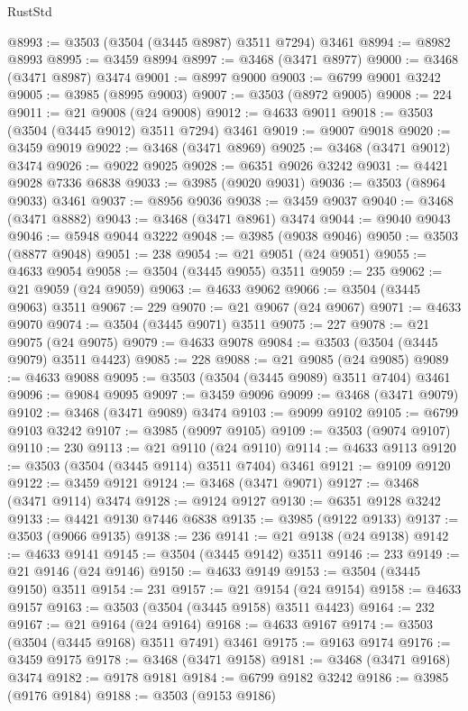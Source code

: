 \begin{lexlean}{RustStd}
\begin{coremodule}
@8993 := @3503 (@3504 (@3445 @8987) @3511 @7294) @3461
@8994 := @8982 @8993
@8995 := @3459 @8994
@8997 := @3468 (@3471 @8977)
@9000 := @3468 (@3471 @8987) @3474
@9001 := @8997 @9000
@9003 := @6799 @9001 @3242
@9005 := @3985 (@8995 @9003)
@9007 := @3503 (@8972 @9005)
@9008 := 224
@9011 := @21 @9008 (@24 @9008)
@9012 := @4633 @9011
@9018 := @3503 (@3504 (@3445 @9012) @3511 @7294) @3461
@9019 := @9007 @9018
@9020 := @3459 @9019
@9022 := @3468 (@3471 @8969)
@9025 := @3468 (@3471 @9012) @3474
@9026 := @9022 @9025
@9028 := @6351 @9026 @3242
@9031 := @4421 @9028 @7336 @6838
@9033 := @3985 (@9020 @9031)
@9036 := @3503 (@8964 @9033) @3461
@9037 := @8956 @9036
@9038 := @3459 @9037
@9040 := @3468 (@3471 @8882)
@9043 := @3468 (@3471 @8961) @3474
@9044 := @9040 @9043
@9046 := @5948 @9044 @3222
@9048 := @3985 (@9038 @9046)
@9050 := @3503 (@8877 @9048)
@9051 := 238
@9054 := @21 @9051 (@24 @9051)
@9055 := @4633 @9054
@9058 := @3504 (@3445 @9055) @3511
@9059 := 235
@9062 := @21 @9059 (@24 @9059)
@9063 := @4633 @9062
@9066 := @3504 (@3445 @9063) @3511
@9067 := 229
@9070 := @21 @9067 (@24 @9067)
@9071 := @4633 @9070
@9074 := @3504 (@3445 @9071) @3511
@9075 := 227
@9078 := @21 @9075 (@24 @9075)
@9079 := @4633 @9078
@9084 := @3503 (@3504 (@3445 @9079) @3511 @4423)
@9085 := 228
@9088 := @21 @9085 (@24 @9085)
@9089 := @4633 @9088
@9095 := @3503 (@3504 (@3445 @9089) @3511 @7404) @3461
@9096 := @9084 @9095
@9097 := @3459 @9096
@9099 := @3468 (@3471 @9079)
@9102 := @3468 (@3471 @9089) @3474
@9103 := @9099 @9102
@9105 := @6799 @9103 @3242
@9107 := @3985 (@9097 @9105)
@9109 := @3503 (@9074 @9107)
@9110 := 230
@9113 := @21 @9110 (@24 @9110)
@9114 := @4633 @9113
@9120 := @3503 (@3504 (@3445 @9114) @3511 @7404) @3461
@9121 := @9109 @9120
@9122 := @3459 @9121
@9124 := @3468 (@3471 @9071)
@9127 := @3468 (@3471 @9114) @3474
@9128 := @9124 @9127
@9130 := @6351 @9128 @3242
@9133 := @4421 @9130 @7446 @6838
@9135 := @3985 (@9122 @9133)
@9137 := @3503 (@9066 @9135)
@9138 := 236
@9141 := @21 @9138 (@24 @9138)
@9142 := @4633 @9141
@9145 := @3504 (@3445 @9142) @3511
@9146 := 233
@9149 := @21 @9146 (@24 @9146)
@9150 := @4633 @9149
@9153 := @3504 (@3445 @9150) @3511
@9154 := 231
@9157 := @21 @9154 (@24 @9154)
@9158 := @4633 @9157
@9163 := @3503 (@3504 (@3445 @9158) @3511 @4423)
@9164 := 232
@9167 := @21 @9164 (@24 @9164)
@9168 := @4633 @9167
@9174 := @3503 (@3504 (@3445 @9168) @3511 @7491) @3461
@9175 := @9163 @9174
@9176 := @3459 @9175
@9178 := @3468 (@3471 @9158)
@9181 := @3468 (@3471 @9168) @3474
@9182 := @9178 @9181
@9184 := @6799 @9182 @3242
@9186 := @3985 (@9176 @9184)
@9188 := @3503 (@9153 @9186)

\end{coremodule}
\end{lexlean}
